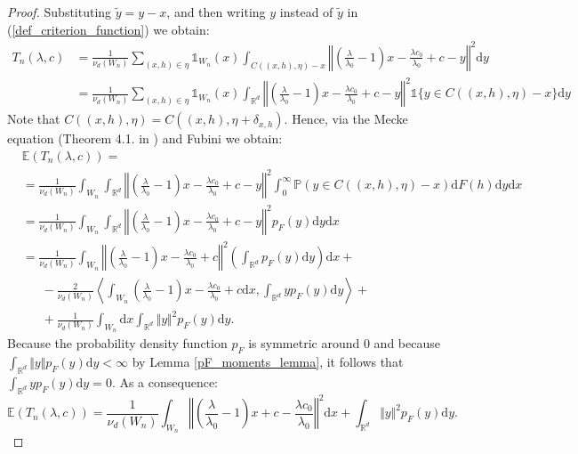 \documentclass{article}
\newcommand{\RR}{\mathbb{R}}
\newcommand{\PP}{\mathbb{P}}
\newcommand{\EE}{\mathbb{E}}
\theoremstyle{plain}
\theoremstyle{remark}
\theoremstyle{definition}
\begin{document}
\begin{proof}
    Substituting $\tilde{y} = y-x$, and then writing $y$ instead of $\tilde{y}$ in (\ref{def_criterion_function}) we obtain:
    \begin{align*}
        T_n(\lambda,c) &=\frac{1}{\nu_d(W_n)}\sum_{(x,h) \in \eta}\mathds{1}_{W_n}(x)\int_{C((x,h),\eta)-x} \left\Vert \left(\frac{\lambda}{\lambda_0}-1\right)x -\frac{\lambda c_0}{\lambda_0} + c - y \right\Vert^2 \mathrm{d}y\\
        &= \frac{1}{\nu_d(W_n)}\sum_{(x,h) \in \eta}\mathds{1}_{W_n}(x)\int_{\RR^d} \left\Vert \left(\frac{\lambda}{\lambda_0}-1\right)x -\frac{\lambda c_0}{\lambda_0} + c - y \right\Vert^2 \mathds{1}\{y \in C((x,h),\eta)-x\} \mathrm{d}y
    \end{align*}
Note that $C((x,h),\eta) = C((x,h),\eta + \delta_{x,h})$. Hence, via the Mecke equation (Theorem 4.1. in \cite{Last2018}) and Fubini we obtain:
{\allowdisplaybreaks
\begin{align*}
    &\EE\left(T_n(\lambda,c) \right) = \\
    &=\frac{1}{\nu_d(W_n)} \int_{W_n}\int_{\RR^d} \left\Vert \left(\frac{\lambda}{\lambda_0}-1\right)x -\frac{\lambda c_0}{\lambda_0} + c - y \right\Vert^2 \int_0^\infty \PP\left(y \in C((x,h),\eta)-x \right)\mathrm{d}F(h)\mathrm{d}y\mathrm{d}x\\
    &= \frac{1}{\nu_d(W_n)} \int_{W_n}\int_{\RR^d} \left\Vert \left(\frac{\lambda}{\lambda_0}-1\right)x -\frac{\lambda c_0}{\lambda_0} + c - y \right\Vert^2 p_F(y)\mathrm{d}y \mathrm{d}x\\
    &= \frac{1}{\nu_d(W_n)} \int_{W_n} \left\Vert \left(\frac{\lambda}{\lambda_0}-1\right)x -\frac{\lambda c_0}{\lambda_0} + c \right\Vert^2 \left(\int_{\RR^d}p_F(y)\mathrm{d}y\right)\mathrm{d}x +\\
    &\phantom{=} \ -\frac{2}{\nu_d(W_n)}\left\langle \int_{W_n}\left(\frac{\lambda}{\lambda_0} -1\right)x -\frac{\lambda c_0}{\lambda_0} + c\mathrm{d}x, \int_{\RR^d}y p_F(y)\mathrm{d}y \right\rangle + \\
    &\phantom{=} \ + \frac{1}{\nu_d(W_n)} \int_{W_n}\mathrm{d}x\int_{\RR^d}\Vert y \Vert^2 p_F(y)\mathrm{d}y.
\end{align*}
}%
Because the probability density function $p_F$ is symmetric around $0$ and because\\ $\int_{\RR^d} \Vert y \Vert p_F(y)\mathrm{d}y < \infty$ by Lemma \ref{pF_moments_lemma}, it follows that $\int_{\RR^d} y p_F(y)\mathrm{d}y = 0$. As a consequence:
\[\EE\left(T_n(\lambda,c)\right) = \frac{1}{\nu_d(W_n)}\int_{W_n} \left\Vert \left(\frac{\lambda}{\lambda_0} - 1 \right)x + c - \frac{\lambda c_0}{\lambda_0} \right\Vert^2 \mathrm{d}x + \int_{\RR^d}\Vert y \Vert^2 p_F(y)\mathrm{d}y.\]
\end{proof}
\end{document}
